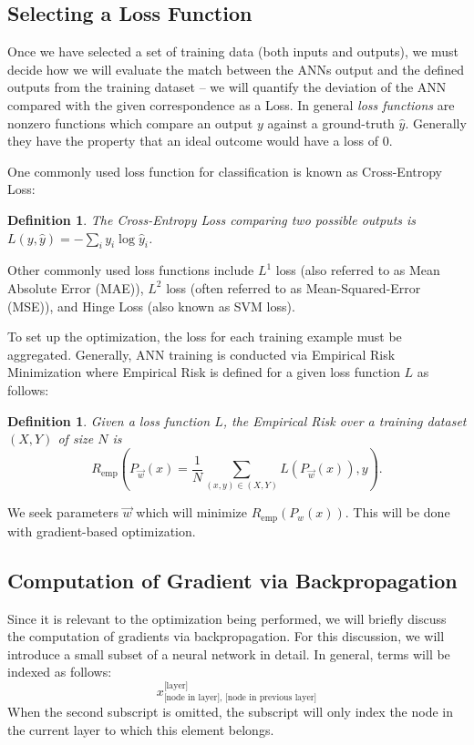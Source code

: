 \documentclass[10pt]{extarticle}
\newtheorem{definition}[theorem]{Definition}
\begin{document}
\subsection{Selecting a Loss Function}

Once we have selected a set of training data (both inputs and outputs), we must decide how we will evaluate the match between the ANNs output and the defined outputs from the training dataset -- we will quantify the deviation of the ANN compared with the given correspondence as a Loss. In general \emph{loss functions} are nonzero functions which compare an output $y$ against a ground-truth $\hat y$. Generally they have the property that an ideal outcome would have a loss of 0. 

One commonly used loss function for classification is known as Cross-Entropy Loss:
\begin{definition}{The Cross-Entropy Loss comparing two possible outputs is}
$L(y,\hat y) = -\sum_i y_i \log \hat y_i$.
\end{definition}
Other commonly used loss functions include $L^1$ loss (also referred to as Mean Absolute Error (MAE)), $L^2$ loss (often referred to as Mean-Squared-Error (MSE)), and Hinge Loss (also known as SVM loss). 

To set up the optimization, the loss for each training example must be aggregated. Generally, ANN training is conducted via Empirical Risk Minimization where Empirical Risk is defined for a given loss function $L$ as follows:
\begin{definition}{Given a loss function $L$, the Empirical Risk over a training dataset $(X,Y)$ of size $N$ is }
\[R_{\text{emp}}(P_{\vec w}(x) = \dfrac{1}{N} \sum_{(x,y) \in (X,Y)} L(P_{\vec w}(x)), y).\]
\end{definition}
We seek parameters $\vec w$ which will minimize $R_{\text{emp}}(P_{w}(x))$. This will be done with gradient-based optimization. 

\subsection{Computation of Gradient via Backpropagation}

Since it is relevant to the optimization being performed, we will briefly discuss the computation of gradients via backpropagation. For this discussion, we will introduce a small subset of a neural network in detail. In general, terms will be indexed as follows:
\[ x^{\text{[layer]}}_{\text{[node in layer], [node in previous layer]}}\]
When the second subscript is omitted, the subscript will only index the node in the current layer to which this element belongs. 
\end{document}
